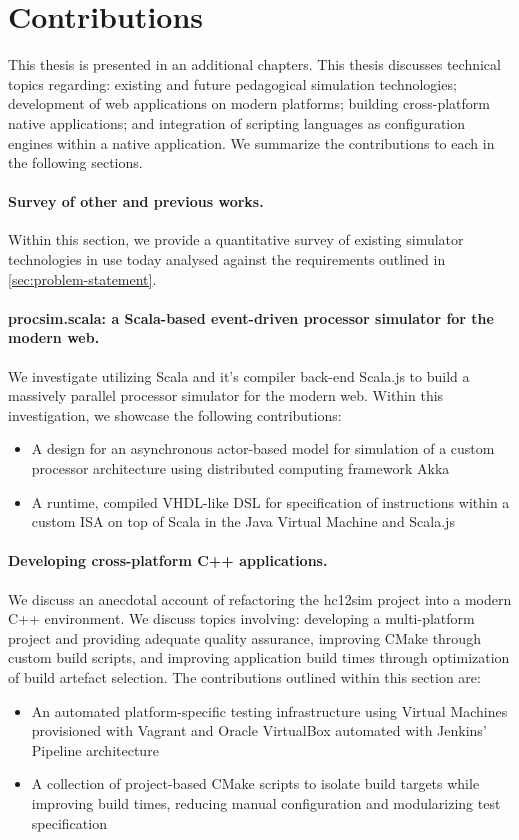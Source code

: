\section{Contributions}

This thesis is presented in an additional  chapters. This thesis discusses technical topics regarding: existing and future pedagogical simulation technologies; development of web applications on modern platforms; building cross-platform native applications; and integration of scripting languages as configuration engines within a native application. We summarize the contributions to each in the following sections.

\paragraph{Survey of other and previous works.} Within this section, we provide a quantitative survey of existing simulator technologies in use today analysed against the requirements outlined in \cref{sec:problem-statement}.

\paragraph{procsim.scala: a Scala-based event-driven processor simulator for the modern web.} We investigate utilizing Scala and it's compiler back-end Scala.js to build a massively parallel processor simulator for the modern web. Within this investigation, we showcase the following contributions: 
\begin{itemize}
    \item A design for an asynchronous actor-based model for simulation of a custom processor architecture using distributed computing framework Akka
    \item A runtime, compiled VHDL-like DSL for specification of instructions within a custom ISA on top of Scala in the Java Virtual Machine and Scala.js
\end{itemize}

\paragraph{Developing cross-platform C++ applications.} We discuss an anecdotal account of refactoring the hc12sim project into a modern C++ environment. We discuss topics involving: developing a multi-platform project and providing adequate quality assurance, improving CMake through custom build scripts, and improving application build times through optimization of build artefact selection. The contributions outlined within this section are: 
\begin{itemize}
    \item An automated platform-specific testing infrastructure using Virtual Machines provisioned with Vagrant and Oracle VirtualBox automated with Jenkins' Pipeline architecture
    \item A collection of project-based CMake scripts to isolate build targets while improving build times, reducing manual configuration and modularizing test specification
\end{itemize}

